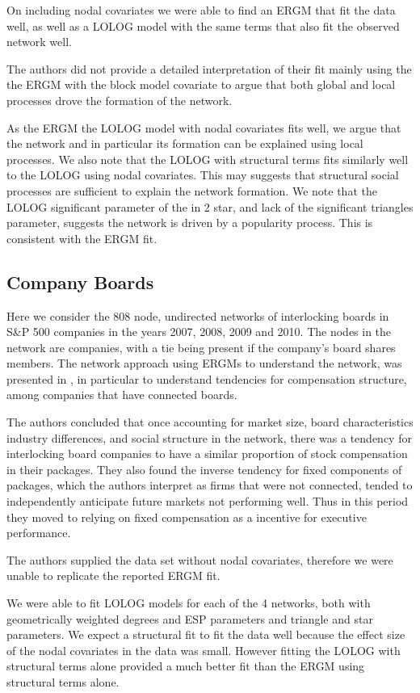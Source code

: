 \documentclass[
]{statsoc}
\begin{document}
On including nodal covariates we were able to find an ERGM that fit the
data well, as well as a LOLOG model with the same terms that also fit
the observed network well.

The authors did not provide a detailed interpretation of their fit
mainly using the the ERGM with the block model covariate to argue that
both global and local processes drove the formation of the network.

As the ERGM the LOLOG model with nodal covariates fits well, we argue
that the network and in particular its formation can be explained using
local processes. We also note that the LOLOG with structural terms fits
similarly well to the LOLOG using nodal covariates. This may suggests
that structural social processes are sufficient to explain the network
formation. We note that the LOLOG significant parameter of the in 2
star, and lack of the significant triangles parameter, suggests the
network is driven by a popularity process. This is consistent with the
ERGM fit.

\subsection{Company Boards}

Here we consider the 808 node, undirected networks of interlocking
boards in S\&P 500 companies in the years 2007, 2008, 2009 and 2010. The
nodes in the network are companies, with a tie being present if the
company's board shares members. The network approach using ERGMs to
understand the network, was presented in \cite{Gygax2015}, in particular
to understand tendencies for compensation structure, among companies
that have connected boards.

The authors concluded that once accounting for market size, board
characteristics industry differences, and social structure in the
network, there was a tendency for interlocking board companies to have a
similar proportion of stock compensation in their packages. They also
found the inverse tendency for fixed components of packages, which the
authors interpret as firms that were not connected, tended to
independently anticipate future markets not performing well. Thus in
this period they moved to relying on fixed compensation as a incentive
for executive performance.

The authors supplied the data set without nodal covariates, therefore we
were unable to replicate the reported ERGM fit.

We were able to fit LOLOG models for each of the 4 networks, both with
geometrically weighted degrees and ESP parameters and triangle and star
parameters. We expect a structural fit to fit the data well because the
effect size of the nodal covariates in the data was small. However
fitting the LOLOG with structural terms alone provided a much better fit
than the ERGM using structural terms alone.
\end{document}
